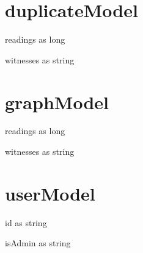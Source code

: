 \section{duplicateModel}
\begin{property}
readings as long
\end{property}
\begin{property}
witnesses as string
\end{property}
\section{graphModel}
\begin{property}
readings as long
\end{property}
\begin{property}
witnesses as string
\end{property}
\section{userModel}
\begin{property}
id as string
\end{property}
\begin{property}
isAdmin as string
\end{property}
